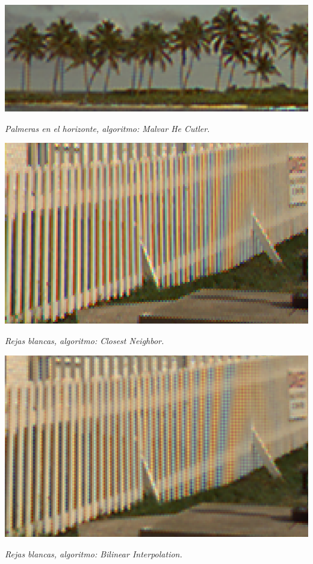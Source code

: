 	\begin{center}
		\includegraphics[scale=.5]{../enunciado/images_files/cualitativo/palms_malvar.png}
		\vspace{2pt}
		\par
		\footnotesize\textit{Palmeras en el horizonte, algoritmo: Malvar He Cutler.}
	\end{center}


	\begin{center}
		\includegraphics[scale=.5]{../enunciado/images_files/cualitativo/pharo_rails_closest.png}
		\vspace{2pt}
		\par
		\footnotesize\textit{Rejas blancas, algoritmo: Closest Neighbor.}
	\end{center}


	\begin{center}
		\includegraphics[scale=.5]{../enunciado/images_files/cualitativo/pharo_rails_bilinear.png}
		\vspace{2pt}
		\par
		\footnotesize\textit{Rejas blancas, algoritmo: Bilinear Interpolation.}
	\end{center}


